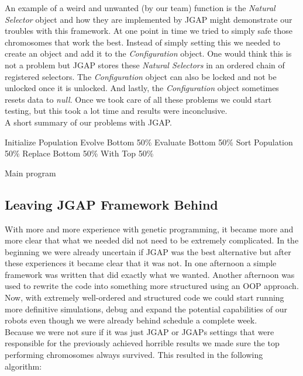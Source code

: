 \documentclass[a4paper,10pt]{article}
\begin{document}
An example of a weird and unwanted (by our team) function 
is the \textit{Natural Selector} object and how they are implemented by JGAP might demonstrate our troubles with this framework. At one point in time we tried to simply safe
 those chromosomes that work the best. Instead of simply setting this
we needed to create an object and add it to the \textit{Configuration} object. One would think this is not a problem but JGAP stores these \textit{Natural Selectors} 
in an ordered
chain of registered selectors. The \textit{Configuration} object can also be locked and not be unlocked once it is unlocked. And lastly, the \textit{Configuration} object
sometimes resets data to \textit{null}. Once we took care of all these problems we could start testing, but this took a lot time and results were inconclusive.\\

A short summary of our problems with JGAP.


\begin{algorithm}
\begin{algorithmic}
\STATE Initialize Population
    \STATE Evolve Bottom 50\%
    \STATE Evaluate Bottom 50\%
    \STATE Sort Population 50\%
    \STATE Replace Bottom 50\% With Top 50\%
\ENDWHILE
\end{algorithmic}
\caption{Main program}
\label{alg:main}
\end{algorithm}


\subsection{Leaving JGAP Framework Behind}
With more and more experience with genetic programming, it became more and more clear that what we needed did not need to be extremely complicated. In the beginning 
we were already uncertain if JGAP was the best alternative but after these experiences it became clear that it was not. In one afternoon a simple framework was written
that did exactly what we wanted. Another afternoon was used to rewrite the code into something more structured using an OOP approach. Now, with extremely well-ordered and
structured code we could start running more definitive simulations, debug and expand the potential capabilities of our robots even though we were already behind schedule
a complete week. \\

Because we were not sure if it was just JGAP or JGAPs settings that were responsible for the previously achieved horrible results we made sure the top performing 
chromosomes always survived. This resulted in the following algorithm:
\end{document}
